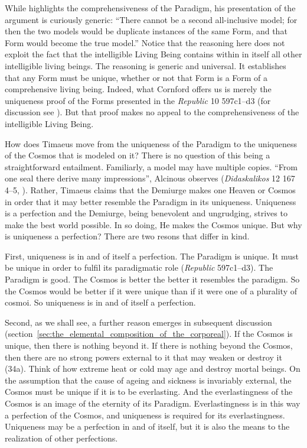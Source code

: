While \citet[42--3]{Cornford:1935fk} highlights the comprehensiveness of the Paradigm, his presentation of the argument is curiously generic: ``There cannot be a second all-inclusive model; for then the two models would be duplicate instances of the same Form, and that Form would become the true model.'' Notice that the reasoning here does not exploit the fact that the intelligible Living Being contains within in itself all other intelligible living beings. The reasoning is generic and universal. It establishes that any Form must be unique, whether or not that Form is a Form of a comprehensive living being. Indeed, what Cornford offers us is merely the uniqueness proof of the Forms presented in the \emph{Republic} 10 597c1--d3 (for discussion see \citealt{Parry:1985tx}). But that proof makes no appeal to the comprehensiveness of the intelligible Living Being.

How does Timaeus move from the uniqueness of the Paradigm to the uniqueness of the Cosmos that is modeled on it? There is no question of this being a straightforward entailment. Familiarly, a model may have multiple copies. ``From one seal there derive many impressions'', Alcinous observes (\emph{Didaskalikos} 12 167 4--5, \citealt[20]{Dillon:2002aa}). Rather, Timaeus claims that the Demiurge makes one Heaven or Cosmos in order that it may better resemble the Paradigm in its uniqueness. Uniqueness is a perfection and the Demiurge, being benevolent and ungrudging, strives to make the best world possible. In so doing, He makes the Cosmos unique. But why is uniqueness a perfection? There are two resons that differ in kind.

First, uniqueness is in and of itself a perfection. The Paradigm is unique. It must be unique in order to fulfil its paradigmatic role (\emph{Republic} 597c1--d3). The Paradigm is good. The Cosmos is better the better it resembles the paradigm. So the Cosmos would be better if it were unique than if it were one of a plurality of cosmoi. So uniqueness is in and of itself a perfection. 

Second, as we shall see, a further reason emerges in subsequent discussion (section~\ref{sec:the_elemental_composition_of_the_corporeal}). If the Cosmos is unique, then there is nothing beyond it. If there is nothing beyond the Cosmos, then there are no strong powers external to it that may weaken or destroy it (34a). Think of how extreme heat or cold may age and destroy mortal beings. On the assumption that the cause of ageing and sickness is invariably external, the Cosmos must be unique if it is to be everlasting. And the everlastingness of the Cosmos is an image of the eternity of its Paradigm. Everlastingness is in this way a perfection of the Cosmos, and uniqueness is required for its everlastingness. Uniqueness may be a perfection in and of itself, but it is also the means to the realization of other perfections.

